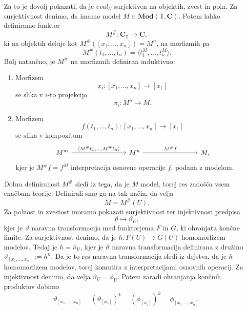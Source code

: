 \documentclass[../kategoricna_logika.tex]{subfiles}
\begin{document}
\begin{dokaz}
Za to je dovolj pokazati, da je $eval_U$ surjektiven na objektih, zvest in poln.
Za surjektivnost denimo, da imamo model
$M \in \mathbf{Mod}(\mathbb{T}, \mathbf{C})$. Potem lahko definiramo funktor
$$M^{\#} : \mathbf{C}_\mathbb{T} \to \mathbf{C},$$
ki na objektih deluje kot $M^{\#}([x_1, \ldots, x_n]) = M^n$, na
morfizmih pa
$$M^{\#}(t_1, \ldots, t_n) = \langle t_1^M, \ldots, t_n^M \rangle.$$
%
Bolj natančno, je $M^{\#}$ na morfizmih definiran induktivno:
\begin{enumerate}
\item Morfizem $$x_i : [x_1, \ldots, x_n] \to [x_1]$$ se slika v
  $i$-to projekcijo $$\pi_i : M^n \to M.$$
\item Morfizem $$f(t_1, \ldots, t_n) : [x_1, \ldots, x_n] \to [x_1]$$
  se slika v kompozitum
\begin{equation*}
    \begin{tikzcd}[column sep = 8em]
      M^m \ar[r, "{\langle M^{\#}t_1, \ldots, M^{\#}t_n \rangle}"] & M^n \ar[r,
      "{M^{\#}f}"] & M,
    \end{tikzcd}
  \end{equation*}
  kjer je $M^{\#}f = f^M$ interpretacija osnovne operacije $f$,
  podana z modelom.
\end{enumerate}
%
Dobra definiranost $M^{\#}$ sledi iz tega, da je $M$ model, torej res zadošča vsem enačbam teorije.
Definirali smo ga na tak način, da velja
$$M = M^{\#}(U).$$
%
Za polnost in zvestost moramo pokazati surjektivnost ter injektivnost
predpisa $$\vartheta \mapsto \vartheta_U,$$
kjer je $\vartheta$ naravna transformacija med funktorjema $F$ in $G$, ki ohranjata končne limite.
Za surjektivnost denimo, da je $h : F(U) \to G(U)$ homomorfizem modelov. Tedaj je $h = \vartheta_U$,
kjer je $\vartheta$ naravna transformacija definirana z družino $\vartheta_{[x_1, \ldots, x_n]} := h^n$.
Da je to res naravna transformacija sledi iz dejstva, da je $h$ homomorfizem modelov,
torej komutira z interpretacijami osnovnih operacij.
Za injektivnost denimo, da velja $\vartheta_U = \phi_U $.
Potem zaradi ohranjanja končnih produktov dobimo
\[ \vartheta_{[x_1, \ldots, x_n]} = (\vartheta_{[x_1]})^k = (\phi_{[x_1]})^k = \phi_{[x_1,\ldots, x_n]}. \]


\end{dokaz}
\end{document}
